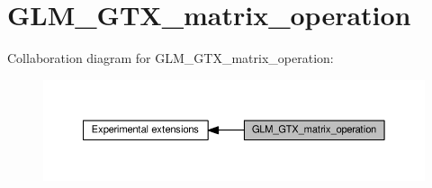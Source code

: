\hypertarget{group__gtx__matrix__operation}{}\section{G\+L\+M\+\_\+\+G\+T\+X\+\_\+matrix\+\_\+operation}
\label{group__gtx__matrix__operation}
Collaboration diagram for G\+L\+M\+\_\+\+G\+T\+X\+\_\+matrix\+\_\+operation\+:
\nopagebreak
\begin{figure}[H]
\begin{center}
\leavevmode
\includegraphics[width=350pt]{df/d2c/group__gtx__matrix__operation}
\end{center}
\end{figure}
